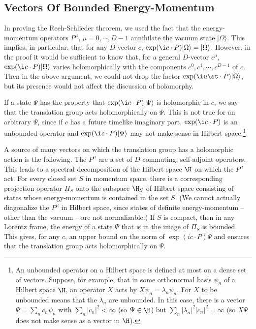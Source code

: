 \documentclass[12pt]{article}
\numberwithin{equation}{section}
\begin{document}
\subsection{Vectors Of Bounded Energy-Momentum}\label{bounded}

In proving the Reeh-Schlieder theorem, we used the fact that the energy-momentum operators $P^\mu,\,\mu=0,\cdots,D-1$ annihilate 
the vacuum state $|\Omega\rangle$.
This implies, in particular, that for any $D$-vector $c$, $\exp(\i c\cdot P)|\Omega\rangle=|\Omega\rangle$.  
 However\cite{Borchersold}, in the proof
it would be sufficient to know that, for a general $D$-vector $c^\mu$,  $\exp(\i c\cdot P)|\Omega\rangle$ varies holomorphically with the
components $c^0,c^1,\cdots, c^{D-1}$ of $c$.    Then in the above argument, we could not drop the factor $\exp(\i u \st\cdot P)|\Omega\rangle$,
but its presence would not affect the discussion of holomorphy.  

If a state $\Psi$ has the property that $\exp(\i c\cdot P)|\Psi\rangle$ is holomorphic in $c$, we say that the translation group
acts holomorphically on $\Psi$. 
 This is not true for an arbitrary $\Psi$, since if $c$ has a future timelike imaginary
part, $\exp(\i c\cdot P)$ is an unbounded operator and $\exp(\i c\cdot P)|\Psi\rangle$ may not make sense in Hilbert space.\footnote{\label{remember} An unbounded operator on a Hilbert space is defined at most on a dense set of vectors.
Suppose, for example, that in some orthonormal basis
$\psi_n$ of a Hilbert space $\H$, an operator $X$ acts by $X\psi_n=\lambda_n\psi_n$.  For $X$ to be unbounded means
that the $\lambda_n$ are unbounded.  In this case, there is a vector $\Psi=\sum_n c_n \psi_n$ with $\sum_n|c_n|^2<\infty$ (so
$\Psi\in \H$) but $\sum_n |\lambda_n|^2|c_n|^2=\infty$ (so $X\Psi$ does not make sense as a vector in $\H$).}

  A source of many vectors  on which the translation group has a holomorphic action 
is the following.  The $P^\mu$ are a set of $D$ commuting, self-adjoint operators.  This leads to a spectral decomposition of the Hilbert
space $\H$ on which the $P^\mu$ act.  For every closed set $S$ in momentum space, there is a corresponding projection operator $\Pi_S$
onto the subspace $\H_S$ of Hilbert space consisting of states whose energy-momentum is contained in the set $S$.  (We cannot actually
diagonalize the $P^\mu$ in Hilbert space, since states of definite energy-momentum -- other than the vacuum -- are not normalizable.)
If $S$ is compact, then in any Lorentz frame, the energy of a state $\Psi$ that is in the image of $\Pi_S$ is bounded.
This  gives, for any $c$, an upper bound on the norm of $\exp(ic\cdot P)\Psi$ and ensures that the translation group acts holomorphically
on $\Psi$.
\end{document}
